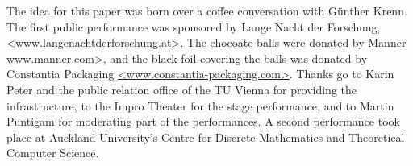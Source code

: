 \documentclass[prb,amssymb,preprint]{revtex4}
\begin{document}
\begin{acknowledgements}
The idea for this paper was born over a coffee conversation with G\"unther
Krenn. The first public performance was sponsored by Lange Nacht der
Forschung,
\url{<www.langenachtderforschung.at>}.
The chocoate balls
were donated by Manner \url{www.manner.com>}, and the black foil covering
the balls was donated by Constantia Packaging
\url{<www.constantia-packaging.com>}.
Thanks go to Karin Peter and the public relation office of the TU Vienna for
providing the infrastructure, to the Impro Theater for the stage
performance, and to Martin Puntigam for moderating part of the performances.
A second performance took place at Auckland University's
Centre for Discrete Mathematics and Theoretical Computer Science.
\end{acknowledgements}
\end{document}
